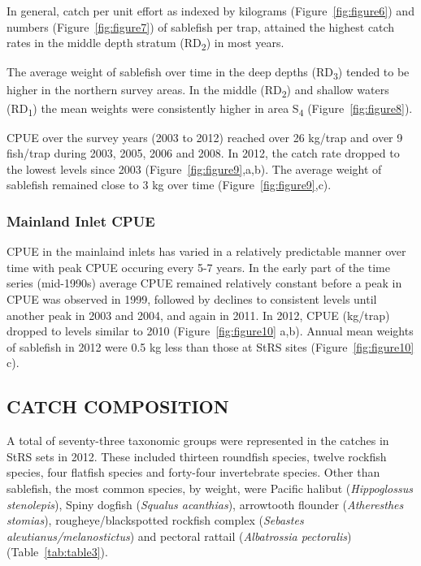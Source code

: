 \documentclass[12pt]{article}\usepackage[]{graphicx}\usepackage[]{color}
\begin{document}
In general, catch per unit effort as indexed by kilograms (Figure~\ref{fig:figure6}) and numbers (Figure~\ref{fig:figure7}) of sablefish per trap, attained the highest catch rates in the middle depth stratum (RD\textsubscript{2}) in most years.

The average weight of sablefish over time in the deep depths (RD\textsubscript{3}) tended to be higher in the northern survey areas. In the middle (RD\textsubscript{2}) and shallow waters (RD\textsubscript{1}) the mean weights were consistently higher in area S\textsubscript{4} (Figure~\ref{fig:figure8}).

CPUE over the survey years (2003 to 2012) reached over 26 kg/trap and over 9 fish/trap during 2003, 2005, 2006 and 2008. In 2012, the catch rate dropped to the lowest levels since 2003 (Figure~\ref{fig:figure9},a,b). The average weight of sablefish remained close to 3 kg over time (Figure~\ref{fig:figure9},c).

\hypertarget{mainland-inlet-cpue}{%
\subsubsection{Mainland Inlet CPUE}\label{mainland-inlet-cpue}}

CPUE in the mainlaind inlets has varied in a relatively predictable manner over time with peak CPUE occuring every 5-7 years. In the early part of the time series (mid-1990s) average CPUE remained relatively constant before a peak in CPUE was observed in 1999, followed by declines to consistent levels until another peak in 2003 and 2004, and again in 2011. In 2012, CPUE (kg/trap) dropped to levels similar to 2010 (Figure~\ref{fig:figure10} a,b). Annual mean weights of sablefish in 2012 were 0.5 kg less than those at StRS sites (Figure~\ref{fig:figure10} c).

\hypertarget{catch-composition}{%
\subsection{CATCH COMPOSITION}\label{catch-composition}}

A total of seventy-three taxonomic groups were represented in the catches in StRS sets in 2012. These included thirteen roundfish species, twelve rockfish species, four flatfish species and forty-four invertebrate species. Other than sablefish, the most common species, by weight, were Pacific halibut (\emph{Hippoglossus stenolepis}), Spiny dogfish (\emph{Squalus acanthias}), arrowtooth flounder (\emph{Atheresthes stomias}), rougheye/blackspotted rockfish complex (\emph{Sebastes aleutianus/melanostictus}) and pectoral rattail (\emph{Albatrossia pectoralis}) (Table~\ref{tab:table3}).
\end{document}
